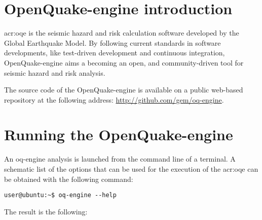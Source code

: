 \section{OpenQuake-engine introduction}
\gls{acr:oqe} is the seismic hazard and risk calculation software developed 
by the Global Earthquake Model. By following current standards in software 
developments, like test-driven development and continuous
integration, OpenQuake-engine aims a becoming an open, and community-driven tool for
seismic hazard and risk analysis.

The source code of the OpenQuake-engine is available on a public web-based
repository at the following address: 
\href{http://github.com/gem/oq-engine}{http://github.com/gem/oq-engine}.
\section{Running the OpenQuake-engine}
\label{sec:intro}
An oq-engine analysis is launched from the command line of a terminal. 
%
A schematic list of the options that can be used for the execution of the 
\gls{acr:oqe} can be obtained with the following command:
\begin{Verbatim}[frame=single, commandchars=\\\{\}, fontsize=\small]
user@ubuntu:~$ oq-engine --help
\end{Verbatim}
The result is the following:
